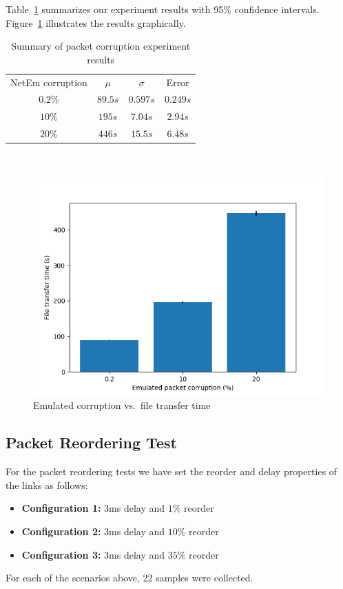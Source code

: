 \documentclass[conference]{IEEEtran}
\begin{document}
Table~\ref{table:corruption} summarizes our experiment results with 95\% confidence intervals.
Figure~\ref{fig:corruption} illustrates the results graphically.
\begin{table}
    \centering
    \begin{tabular}{c c c c}
        \toprule
        NetEm corruption & $\mu$ & $\sigma$ & Error \\
        $0.2\%$   &   $89.5s$   &   $0.597s$    &   $0.249s$ \\
        $10\%$   &    $195s$   &   $7.04s$    &   $2.94s$ \\
        $20\%$   &    $446s$   &   $15.5s$    &   $6.48s$ \\
        \bottomrule
    \end{tabular}\label{table:corruption} \\
    \caption{Summary of packet corruption experiment results}\label{table:corruption}
\end{table}

\begin{figure}
    \centering
    \includegraphics[scale=0.6]{graphics/plot-corruption}
    \caption{Emulated corruption vs.\ file transfer time}\label{fig:corruption}
\end{figure}

\subsection{Packet Reordering Test}\label{AA}

For the packet reordering tests we have set the reorder and delay properties of the links as follows:
\begin{itemize}
    \item \textbf{Configuration 1:} 3ms delay and $1\%$ reorder
    \item \textbf{Configuration 2:} 3ms delay and $10\%$ reorder
    \item \textbf{Configuration 3:} 3ms delay and $35\%$ reorder
\end{itemize}
For each of the scenarios above, 22 samples were collected.
\end{document}
